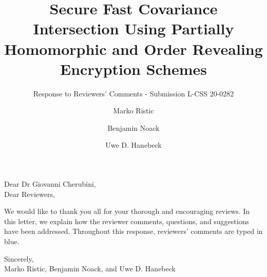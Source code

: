 \documentclass[a4paper]{scrartcl}
\title{\boldmath Secure Fast Covariance Intersection Using Partially Homomorphic and Order Revealing Encryption Schemes}
\subtitle{Response to Reviewers' Comments - Submission L-CSS 20-0282}
\author{Marko Ristic\and Benjamin Noack\and Uwe D. Hanebeck}
\newcommand{\reviewtext}[1]{{\color{nblue} #1}}
\begin{document}
\maketitle

Dear Dr Giovanni Cherubini,\\
Dear Reviewers,

We would like to thank you all for your thorough and encouraging reviews. In this letter, we explain how the reviewer comments, questions, and suggestions have been addressed. Throughout this response, reviewers' comments are typed in \reviewtext{blue}. 

Sincerely,\\
Marko Ristic, Benjamin Noack, and Uwe D. Hanebeck

\end{document}
